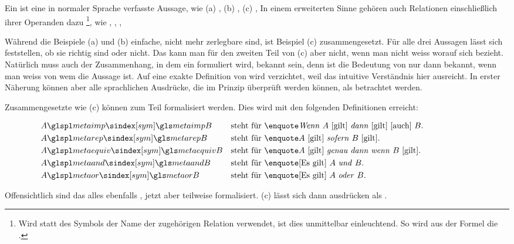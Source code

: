 Ein \emph{} ist eine in normaler Sprache verfasste Aussage, wie \textzB
(a) ,
(b) ,
(c) ,
\textusw
In einem erweiterten Sinne gehören auch Relationen einschließlich ihrer Operanden dazu%
\footnote{%
	Wird statt des Symbols der Name der zugehörigen Relation verwendet, ist dies unmittelbar einleuchtend.
	So wird \textzB aus der Formel  die  .%
},
wie \textzB {}, , , \textusw

Während die Beispiele (a) und (b) einfache, nicht mehr zerlegbare  sind, ist Beispiel (c) zusammengesetzt.
Für alle drei Aussagen lässt sich feststellen, ob sie richtig sind oder nicht.
Das kann man für den zweiten Teil von (c) aber nicht, wenn man nicht weiss worauf sich  bezieht.
Natürlich muss auch der Zusammenhang, in dem ein  formuliert wird, bekannt sein, denn \textzB ist die Bedeutung von  nur dann bekannt, wenn man weiss von wem die Aussage ist.
Auf eine exakte Definition von  wird verzichtet, weil das intuitive Verständnis hier ausreicht.
In erster Näherung können aber alle sprachlichen Ausdrücke, die im Prinzip überprüft werden können, als  betrachtet werden.

Zusammengesetzte  wie (c) können zum Teil formalisiert werden.
Dies wird mit den folgenden Definitionen erreicht:

\begin{align}
	& A \glsSym{metaimp}   B & \text{steht für }
	& \text{\strqt{\emph{Wenn} $A$ [gilt] \emph{dann} [gilt] [auch] $B$}.}
	\\
	& A \glsSym{metarep}   B & \text{steht für }
	& \text{\strqt{$A$ [gilt] \emph{sofern} $B$ [gilt]}.}
	\\
	& A \glsSym{metaequiv} B & \text{steht für }
	& \text{\strqt{$A$ [gilt] \emph{genau dann wenn} $B$ [gilt]}.}
	\\
	& A \glsSym{metaand}   B & \text{steht für }
	& \text{\strqt{[Es gilt] $A$ \emph{und} $B$}.}
	\\
	& A \glsSym{metaor}    B & \text{steht für }
	& \text{\strqt{[Es gilt] $A$ \emph{oder} $B$}.}
	\formulatoleft
\end{align}

Offensichtlich sind das alles ebenfalls , jetzt aber teilweise formalisiert.
(c) lässt sich dann ausdrücken als .

